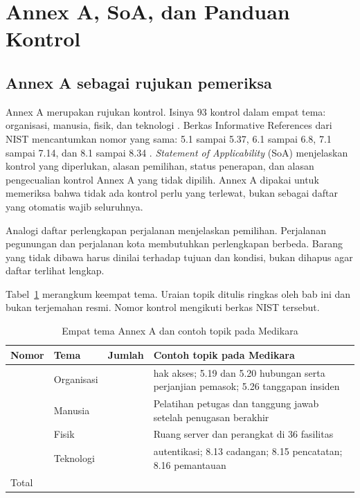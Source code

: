 \section{Annex A, SoA, dan Panduan Kontrol}

\subsection*{Annex A sebagai rujukan pemeriksa}

Annex A merupakan rujukan kontrol. Isinya 93 kontrol dalam empat tema: organisasi, manusia, fisik,
dan teknologi \cite{iso27001-2022,c06-dqs-annexa}. Berkas Informative References dari NIST
mencantumkan nomor yang sama: 5.1 sampai 5.37, 6.1 sampai 6.8, 7.1 sampai 7.14, dan 8.1 sampai 8.34
\cite{c06-nist-irefs}. \textit{Statement of Applicability} (SoA) menjelaskan kontrol yang diperlukan,
alasan pemilihan, status penerapan, dan alasan pengecualian kontrol Annex A yang tidak dipilih.
Annex A dipakai untuk memeriksa bahwa tidak ada kontrol perlu yang terlewat, bukan sebagai daftar
yang otomatis wajib seluruhnya.

Analogi daftar perlengkapan perjalanan menjelaskan pemilihan. Perjalanan pegunungan dan perjalanan
kota membutuhkan perlengkapan berbeda. Barang yang tidak dibawa harus dinilai terhadap tujuan dan
kondisi, bukan dihapus agar daftar terlihat lengkap.

Tabel~\ref{tab:ch06-tema} merangkum keempat tema. Uraian topik ditulis ringkas oleh bab ini dan
bukan terjemahan resmi. Nomor kontrol mengikuti berkas NIST tersebut.

\begin{table}[!htb]
  \centering\small
  \caption{Empat tema Annex A dan contoh topik pada Medikara}\label{tab:ch06-tema}
  \begin{tabularx}{\textwidth}{|>{\raggedright\arraybackslash}p{}|>{\raggedright\arraybackslash}p{}|>{\raggedright\arraybackslash}p{}|>{\raggedright\arraybackslash}X|}
    \hline
    \textbf{Nomor} & \textbf{Tema} & \textbf{Jumlah} & \textbf{Contoh topik pada Medikara} \\ \hline
    5 & Organisasi & 37 & 5.18 hak akses; 5.19 dan 5.20 hubungan serta perjanjian pemasok; 5.26
    tanggapan insiden \\ \hline
    6 & Manusia & 8 & Pelatihan petugas dan tanggung jawab setelah penugasan berakhir \\ \hline
    7 & Fisik & 14 & Ruang server dan perangkat di 36 fasilitas \\ \hline
    8 & Teknologi & 34 & 8.5 autentikasi; 8.13 cadangan; 8.15 pencatatan; 8.16 pemantauan \\ \hline
    Total & & 93 & \\ \hline
  \end{tabularx}
\end{table}

